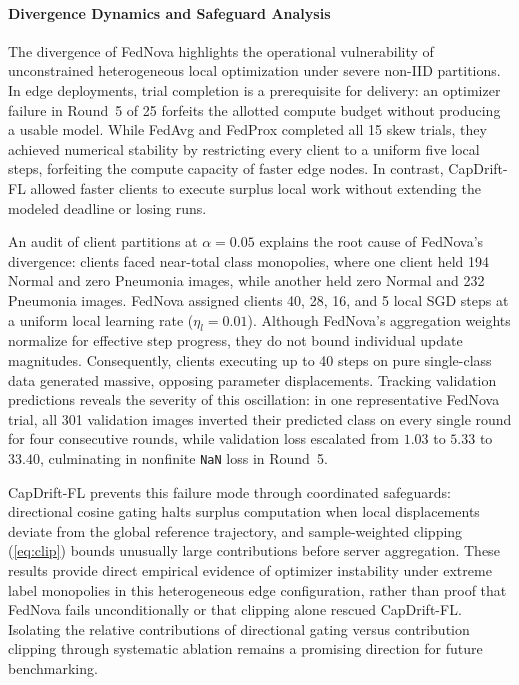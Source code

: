 \documentclass[conference]{IEEEtran}
\begin{document}
\paragraph{Divergence Dynamics and Safeguard Analysis}
The divergence of FedNova highlights the operational vulnerability of unconstrained heterogeneous local optimization under severe non-IID partitions. In edge deployments, trial completion is a prerequisite for delivery: an optimizer failure in Round~5 of 25 forfeits the allotted compute budget without producing a usable model. While FedAvg and FedProx completed all 15 skew trials, they achieved numerical stability by restricting every client to a uniform five local steps, forfeiting the compute capacity of faster edge nodes. In contrast, CapDrift-FL allowed faster clients to execute surplus local work without extending the modeled deadline or losing runs.

An audit of client partitions at $\alpha=0.05$ explains the root cause of FedNova's divergence: clients faced near-total class monopolies, where one client held 194 Normal and zero Pneumonia images, while another held zero Normal and 232 Pneumonia images. FedNova assigned clients 40, 28, 16, and 5 local SGD steps at a uniform local learning rate ($\eta_l=0.01$). Although FedNova's aggregation weights normalize for effective step progress, they do not bound individual update magnitudes. Consequently, clients executing up to 40 steps on pure single-class data generated massive, opposing parameter displacements. Tracking validation predictions reveals the severity of this oscillation: in one representative FedNova trial, all 301 validation images inverted their predicted class on every single round for four consecutive rounds, while validation loss escalated from $1.03$ to $5.33$ to $33.40$, culminating in nonfinite \texttt{NaN} loss in Round~5.

CapDrift-FL prevents this failure mode through coordinated safeguards: directional cosine gating halts surplus computation when local displacements deviate from the global reference trajectory, and sample-weighted clipping (\ref{eq:clip}) bounds unusually large contributions before server aggregation. These results provide direct empirical evidence of optimizer instability under extreme label monopolies in this heterogeneous edge configuration, rather than proof that FedNova fails unconditionally or that clipping alone rescued CapDrift-FL. Isolating the relative contributions of directional gating versus contribution clipping through systematic ablation remains a promising direction for future benchmarking.
\end{document}
